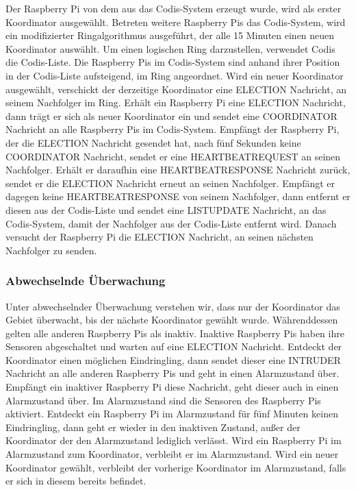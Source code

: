\documentclass[journal]{IEEEtran}
\begin{document}
Der Raspberry Pi von dem aus das Codis-System erzeugt wurde, wird als erster Koordinator ausgewählt. Betreten weitere Raspberry Pis das Codis-System, wird ein modifizierter Ringalgorithmus\cite{verteilte1}\cite{verteilte2} ausgeführt, der alle 15 Minuten einen neuen Koordinator auswählt. Um einen logischen Ring darzustellen, verwendet Codis die Codis-Liste. Die Raspberry Pis im Codis-System sind anhand ihrer Position in der Codis-Liste aufsteigend, im Ring angeordnet. Wird ein neuer Koordinator ausgewählt, verschickt der derzeitige Koordinator eine \MakeUppercase{election} Nachricht, an seinem Nachfolger im Ring. Erhält ein Raspberry Pi eine \MakeUppercase{election} Nachricht, dann trägt er sich als neuer Koordinator ein und sendet eine \MakeUppercase{coordinator} Nachricht an alle Raspberry Pis im Codis-System. Empfängt der Raspberry Pi, der die \MakeUppercase{election} Nachricht gesendet hat, nach fünf Sekunden keine \MakeUppercase{coordinator} Nachricht, sendet er eine \MakeUppercase{heartbeatrequest} an seinen Nachfolger. Erhält er daraufhin eine \MakeUppercase{heartbeatresponse} Nachricht zurück, sendet er die \MakeUppercase{election} Nachricht erneut an seinen Nachfolger. Empfängt er dagegen keine \MakeUppercase{heartbeatresponse} von seinem Nachfolger, dann entfernt er diesen aus der Codis-Liste und sendet eine \MakeUppercase{listupdate} Nachricht, an das Codis-System, damit der Nachfolger aus der Codis-Liste entfernt wird. Danach versucht der Raspberry Pi die \MakeUppercase{election} Nachricht, an seinen nächsten Nachfolger zu senden.

\subsubsection{Abwechselnde Überwachung}

Unter abwechselnder Überwachung verstehen wir, dass nur der Koordinator das Gebiet überwacht, bis der nächste Koordinator gewählt wurde. Währenddessen gelten alle anderen Raspberry Pis als inaktiv. Inaktive Raspberry Pis haben ihre Sensoren abgeschaltet und warten auf eine \MakeUppercase{election} Nachricht. Entdeckt der Koordinator einen möglichen Eindringling, dann sendet dieser eine \MakeUppercase{intruder} Nachricht an alle anderen Raspberry Pis und geht in einen Alarmzustand über. Empfängt ein inaktiver Raspberry Pi diese Nachricht, geht dieser auch in einen Alarmzustand über. Im Alarmzustand sind die Sensoren des Raspberry Pis aktiviert. Entdeckt ein Raspberry Pi im Alarmzustand für fünf Minuten keinen Eindringling, dann geht er wieder in den inaktiven Zustand, außer der Koordinator der den Alarmzustand lediglich verlässt. Wird ein Raspberry Pi im Alarmzustand zum Koordinator, verbleibt er im Alarmzustand. Wird ein neuer Koordinator gewählt, verbleibt der vorherige Koordinator im Alarmzustand, falls er sich in diesem bereits befindet.
\end{document}
